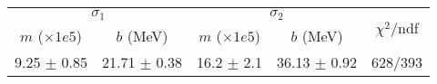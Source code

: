 \begin{tabular}{cc|cc||c}
\multicolumn{2}{c|}{$\sigma_1$} & \multicolumn{2}{|c}{$\sigma_2$}  & \multirow{2}{*}{$\chi^2/$ndf}\\
$m$ ($\times1e5$) & $b$ (MeV) & $m$ ($\times1e5$) & $b$ (MeV)  & \\
\hline
9.25 $\pm$ 0.85 & 21.71 $\pm$ 0.38 & 16.2 $\pm$ 2.1 & 36.13 $\pm$ 0.92 & 628/393\\
\end{tabular}

